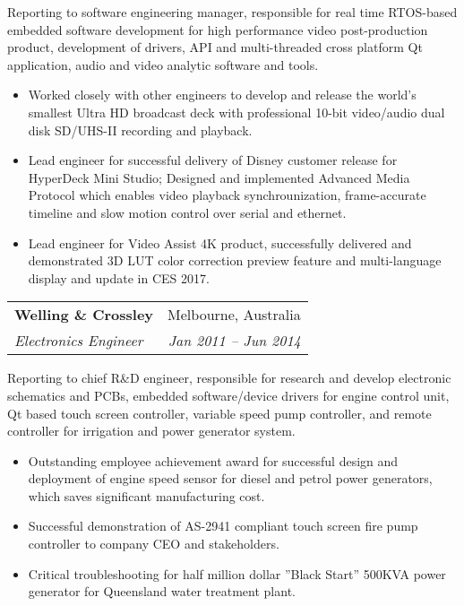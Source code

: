 \documentclass[letterpaper,11pt]{article}
\makeatletter
\newcommand{\resumeItemNoBullet}[4]{
  \vspace{-1pt}
    \begin{tabular*}{0.97\textwidth}{l@{\extracolsep{\fill}}r}
      \textbf{#1} & #2 \\
      \textit{\small#3} & \textit{\small #4} \\
    \end{tabular*}\vspace{-7pt}
}
\newcommand{\resumeSubHeadingListStart}{\begin{itemize}[leftmargin=*]}
\newcommand{\resumeSubHeadingListEnd}{\end{itemize}}
\makeatother
\begin{document}
\vspace{10pt}
{Reporting to software engineering manager, responsible for real time RTOS-based embedded software development for high performance video post-production product, development of drivers, API and multi-threaded cross platform Qt application, audio and video analytic software and tools.}
  \resumeSubHeadingListStart
    \item Worked closely with other engineers to develop and release the world’s smallest Ultra HD broadcast deck with professional 10-bit video/audio dual disk SD/UHS-II recording and playback. 
    \item Lead engineer for successful delivery of Disney customer release for HyperDeck Mini Studio; Designed and implemented Advanced Media Protocol which enables video playback synchrounization, frame-accurate timeline and slow motion control over serial and ethernet.
    \item Lead engineer for Video Assist 4K product, successfully delivered and demonstrated 3D LUT color correction preview feature and multi-language display and update in CES 2017.
  \resumeSubHeadingListEnd

\resumeItemNoBullet
{Welling \& Crossley}{Melbourne, Australia}
{Electronics Engineer}{Jan 2011 -- Jun 2014}

\vspace{10pt}
{ Reporting to chief R\&D engineer, responsible for research and develop electronic schematics and PCBs, embedded software/device drivers for engine control unit, Qt based touch screen controller, variable speed pump controller, and remote controller for irrigation and power generator system. }
  \resumeSubHeadingListStart
    \item Outstanding employee achievement award for successful design and deployment of engine speed sensor for diesel and petrol power generators, which saves significant manufacturing cost.
    \item Successful demonstration of AS-2941 compliant touch screen fire pump controller to company CEO and stakeholders. 
    \item Critical troubleshooting for half million dollar ”Black Start” 500KVA power generator for Queensland water treatment plant. 
  \resumeSubHeadingListEnd

\end{document}
